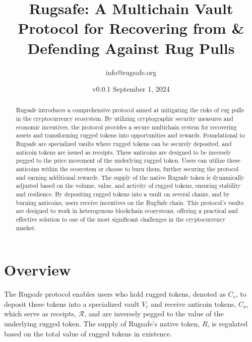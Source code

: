 \documentclass{article}
\title{Rugsafe: A Multichain Vault Protocol for Recovering from \& Defending Against Rug Pulls}
\author{info@rugsafe.org}
\date{v0.0.1 September 1, 2024}
\begin{document}
\maketitle


\begin{abstract}
Rugsafe introduces a comprehensive protocol aimed at mitigating the risks of rug pulls in the cryptocurrency ecosystem. By utilizing cryptographic security measures and economic incentives, the protocol provides a secure multichain system for recovering assets and transforming rugged tokens into opportunities and rewards. Foundational to Rugsafe are specialized vaults where rugged tokens can be securely deposited, and anticoin tokens are issued as receipts. These anticoins are designed to be inversely pegged to the price movement of the underlying rugged token. Users can utilize these anticoins within the ecosystem or choose to burn them, further securing the protocol and earning additional rewards. The supply of the native Rugsafe token is dynamically adjusted based on the volume, value, and activity of rugged tokens, ensuring stability and resilience. By depositing rugged tokens into a vault on several chains, and by burning anticoins, users receive incentives on the RugSafe chain. This protocol's vaults are designed to work in heterogenous blockchain ecosystems, offering a practical and effective solution to one of the most significant challenges in the cryptocurrency market. 
\end{abstract}





\tableofcontents






\section{Overview}

The Rugsafe protocol enables users who hold rugged tokens, denoted as $C_r$, to deposit these tokens into a specialized vault $V_c$ and receive anticoin tokens, $C_a$,  which serve as receipts, \(\mathcal{R} \), and are inversely pegged to the value of the underlying rugged token. The supply of Rugsafe's native token, $R$, is regulated based on the total value of rugged tokens in existence.

\end{document}
